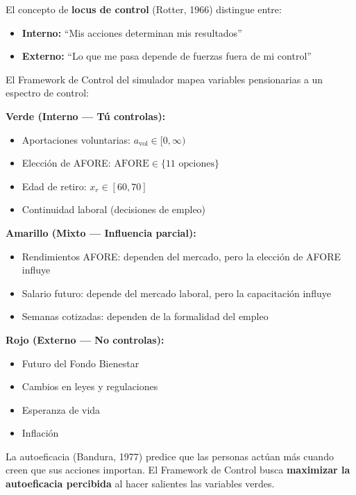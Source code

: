 \documentclass[11pt,a4paper]{report}
\begin{document}
\begin{tcolorbox}[colback=blue!5!white, colframe=blue!75!black, title=\textbf{Definici\'on Formal: Locus de Control y Autoeficacia}]
El concepto de \textbf{locus de control} (Rotter, 1966) distingue entre:
\begin{itemize}
  \item \textbf{Interno:} ``Mis acciones determinan mis resultados''
  \item \textbf{Externo:} ``Lo que me pasa depende de fuerzas fuera de mi control''
\end{itemize}

El Framework de Control del simulador mapea variables pensionarias a un espectro de control:

\textbf{Verde (Interno --- T\'u controlas):}
\begin{itemize}
  \item Aportaciones voluntarias: $a_{\text{vol}} \in [0, \infty)$
  \item Elecci\'on de AFORE: $\text{AFORE} \in \{\text{11 opciones}\}$
  \item Edad de retiro: $x_r \in [60, 70]$
  \item Continuidad laboral (decisiones de empleo)
\end{itemize}

\textbf{Amarillo (Mixto --- Influencia parcial):}
\begin{itemize}
  \item Rendimientos AFORE: dependen del mercado, pero la elecci\'on de AFORE influye
  \item Salario futuro: depende del mercado laboral, pero la capacitaci\'on influye
  \item Semanas cotizadas: dependen de la formalidad del empleo
\end{itemize}

\textbf{Rojo (Externo --- No controlas):}
\begin{itemize}
  \item Futuro del Fondo Bienestar
  \item Cambios en leyes y regulaciones
  \item Esperanza de vida
  \item Inflaci\'on
\end{itemize}

La autoeficacia (Bandura, 1977) predice que las personas act\'uan m\'as cuando creen que sus acciones importan. El Framework de Control busca \textbf{maximizar la autoeficacia percibida} al hacer salientes las variables verdes.
\end{tcolorbox}
\end{document}
